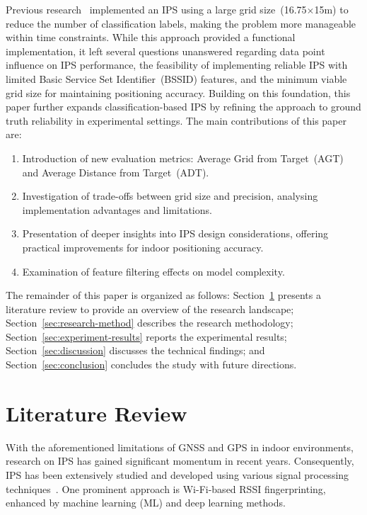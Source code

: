 \documentclass[runningheads]{llncs}
\begin{document}
Previous research~\cite{LRE1} implemented an IPS using a large grid size~(16.75$\times$15m) to reduce the number of classification labels, making the problem more manageable within time constraints. While this approach provided a functional implementation, it left several questions unanswered regarding data point influence on IPS performance, the feasibility of implementing reliable IPS with limited Basic Service Set Identifier~(BSSID) features, and the minimum viable grid size for maintaining positioning accuracy. Building on this foundation, this paper further expands classification-based IPS by refining the approach to ground truth reliability in experimental settings. The main contributions of this paper are:
\begin{enumerate}
	\item Introduction of new evaluation metrics: Average Grid from Target~(AGT) and Average Distance from Target~(ADT).
	\item Investigation of trade-offs between grid size and precision, analysing implementation advantages and limitations.
	\item Presentation of deeper insights into IPS design considerations, offering practical improvements for indoor positioning accuracy.
	\item Examination of feature filtering effects on model complexity.
\end{enumerate}
The remainder of this paper is organized as follows: Section~\ref{sec:literature-review} presents a literature review to provide an overview of the research landscape; Section~\ref{sec:research-method} describes the research methodology; Section~\ref{sec:experiment-results} reports the experimental results; Section~\ref{sec:discussion} discusses the technical findings; and Section~\ref{sec:conclusion} concludes the study with future directions.


\section{Literature Review}\label{sec:literature-review}

With the aforementioned limitations of GNSS and GPS in indoor environments, research on IPS has gained significant momentum in recent years. Consequently, IPS has been extensively studied and developed using various signal processing techniques~\cite{bgp4}. One prominent approach is Wi-Fi-based RSSI fingerprinting, enhanced by machine learning (ML) and deep learning methods.
\end{document}
